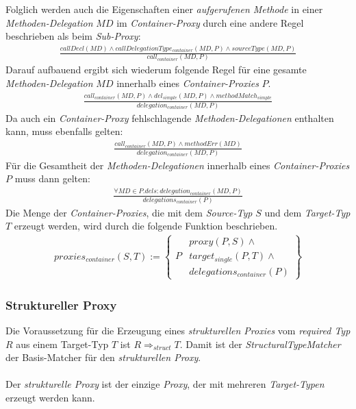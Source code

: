 Folglich werden auch die Eigenschaften einer \emph{aufgerufenen Methode} in einer \emph{Methoden-Delegation} $\mathit{MD}$ im \emph{Container-Proxy} durch eine andere Regel beschrieben als beim \emph{Sub-Proxy}:
\begin{gather*}
\frac{\mathit{callDecl(MD)} \wedge \mathit{callDelegationType_{container}(MD,P)} \wedge \mathit{sourceType(MD,P)}}
{\mathit{call_{container}(MD,P)}}
\end{gather*}
\noindent
Darauf aufbauend ergibt sich wiederum folgende Regel für eine gesamte \emph{Methoden-Delegation} $\mathit{MD}$ innerhalb eines \emph{Container-Proxies} $P$.
\begin{gather*}
\frac{\mathit{call_{container}(MD, P)} \wedge \mathit{del_{simple}(MD, P)} \wedge \mathit{methodMatch_{simple}}}
{\mathit{delegation_{container}(MD, P)}}
\end{gather*}
\noindent
Da auch ein \emph{Container-Proxy} fehlschlagende \emph{Methoden-Delegationen} enthalten kann, muss ebenfalls gelten:
\begin{gather*}
\frac{\mathit{call_{container}(MD, P)} \wedge \mathit{methodErr(MD)}}
{\mathit{delegation_{container}(MD, P)}}
\end{gather*}
\noindent
Für die Gesamtheit der \emph{Methoden-Delegationen} innerhalb eines \emph{Container-Proxies} $P$ muss dann gelten:
\begin{gather*}
\frac{\mathit{\forall \mathit{MD} \in P.dels: \mathit{delegation_{container}(MD,P)}}}
{\mathit{delegations_{container}(P)}}
\end{gather*}
\noindent
Die Menge der \emph{Container-Proxies}, die mit dem \emph{Source-Typ} $S$ und dem \emph{Target-Typ} $T$ erzeugt werden, wird durch die folgende Funktion beschrieben.
\begin{gather*}
\mathit{proxies_{container}(S,T)} := 
\left\{\begin{array}{l|l}
		& \mathit{proxy(P,S)}  \wedge \mathit{ } \\
	P	& \mathit{target_{single}(P,T)} \wedge \mathit{ } \\
		& \mathit{delegations_{container}(P)} 
		 \end{array}
\right\}
\end{gather*}
\subsubsection{Struktureller Proxy}
Die Voraussetzung für die Erzeugung eines \emph{strukturellen Proxies} vom \emph{required Typ} $R$ aus einem Target-Typ $T$ ist $R \Rightarrow_{struct} T$. Damit ist der \emph{StructuralTypeMatcher} der Basis-Matcher für den \emph{strukturellen Proxy}.
\\\\
Der \emph{strukturelle Proxy} ist der einzige \emph{Proxy}, der mit mehreren \emph{Target-Typen} erzeugt werden kann. 
